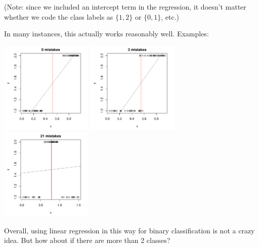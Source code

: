 \documentclass[mathserif]{beamer}
\begin{document}
\begin{frame}
\frametitle{}
(Note: since we included an intercept term in the regression, it doesn't
matter whether we code the class labels as $\{1,2\}$ or $\{0,1\}$, etc.)

\bigskip
In many instances, this actually works reasonably well. Examples:

\bigskip
\includegraphics[width=0.33\textwidth]{lin1.pdf}
\includegraphics[width=0.33\textwidth]{lin2.pdf}
\includegraphics[width=0.33\textwidth]{lin3.pdf}

\bigskip
Overall, using linear regression in this way for binary classification is not 
a crazy idea. But how about if there are more than 2 classes?
\end{frame}
\end{document}
